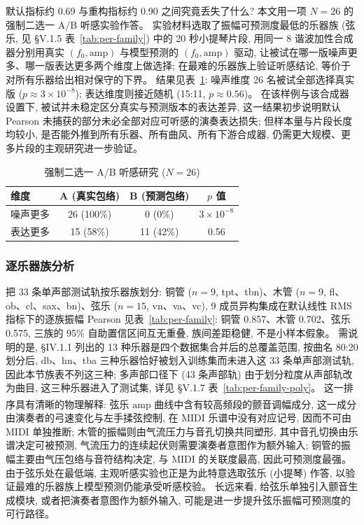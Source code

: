 \documentclass[a4paper, UTF8, zihao=-4, fontset=fandol]{ctexart}
\newcommand{\upcite}[1]{\textsuperscript{\cite{#1}}}
\begin{document}
默认指标约 0.69 与重构指标约 0.90 之间究竟丢失了什么? 本文用一项 $N = 26$ 的强制二选一 A/B 听感实验作答。 实验材料选取了振幅可预测度最低的乐器族 (弦乐, 见 §V.1.5 表~\ref{tab:per-family}) 中的 20 秒小提琴片段, 用同一 8 谐波加性合成器分别用真实 $(f_0, \mathrm{amp})$ 与模型预测的 $(f_0, \mathrm{amp})$ 驱动, 让被试在哪一版噪声更多、哪一版表达更多两个维度上做选择; 在最难的乐器族上验证听感结论, 等价于对所有乐器给出相对保守的下界。 结果见表~\ref{tab:listening}: 噪声维度 26 名被试全部选择真实版 ($p \approx 3 \times 10^{-8}$); 表达维度则接近随机 (15:11, $p \approx 0.56$)。 在该样例与该合成器设置下, 被试并未稳定区分真实与预测版本的表达差异, 这一结果初步说明默认 Pearson 未捕获的部分未必全部对应可听感的演奏表达损失; 但样本量与片段长度均较小, 是否能外推到所有乐器、所有曲风、所有下游合成器, 仍需更大规模、更多片段的主观研究进一步验证。

\begin{table}[htbp]\centering
\caption{强制二选一 A/B 听感研究 ($N = 26$)}\label{tab:listening}
\begin{tabular}{lccc}
\toprule
维度 & A (真实包络) & B (预测包络) & $p$ 值 \\
\midrule
噪声更多 & 26 (100\%) & 0 (0\%) & $3 \times 10^{-8}$ \\
表达更多 & 15 (58\%) & 11 (42\%) & 0.56 \\
\bottomrule
\end{tabular}
\end{table}

\subsubsection{逐乐器族分析}

把 33 条单声部测试轨按乐器族划分: 铜管 ($n = 9$, tpt、tbn)、木管 ($n = 9$, fl、ob、cl、sax、bn)、弦乐 ($n = 15$, vn、va、vc), 9 成员异构集成在默认线性 RMS 指标下的逐族振幅 Pearson 见表~\ref{tab:per-family}: 铜管 0.857、木管 0.702、弦乐 0.575, 三族的 95\% 自助置信区间互无重叠, 族间差距稳健, 不是小样本假象。 需说明的是, §IV.1.1 列出的 13 种乐器是四个数据集合并后的总覆盖范围, 按曲名 80:20 划分后, db、hn、tba 三种乐器恰好被划入训练集而未进入这 33 条单声部测试轨, 因此本节族表不列这三种; 多声部口径下 (43 条声部轨) 由于划分粒度从声部轨改为曲目, 这三种乐器进入了测试集, 详见 §V.1.7 表~\ref{tab:per-family-poly}。 这一排序具有清晰的物理解释: 弦乐 $\mathrm{amp}$ 曲线中含有较高频段的颤音调幅成分\upcite{mellody}, 这一成分由演奏者的弓速变化与左手揉弦控制, 在 MIDI 乐谱中没有对应记号, 因而不可由 MIDI 单独推断; 木管的振幅则由气流压力与音孔切换共同塑形, 其中音孔切换由乐谱决定可被预测, 气流压力的连续起伏则需要演奏者意图作为额外输入; 铜管的振幅主要由气压包络与音符结构决定, 与 MIDI 的关联度最高, 因此可预测度最强。 由于弦乐处在最低端, 主观听感实验也正是为此特意选取弦乐 (小提琴) 作答, 以验证最难的乐器族上模型预测仍能承受听感校验。 长远来看, 给弦乐单独引入颤音生成模块, 或者把演奏者意图作为额外输入, 可能是进一步提升弦乐振幅可预测度的可行路径。
\end{document}
